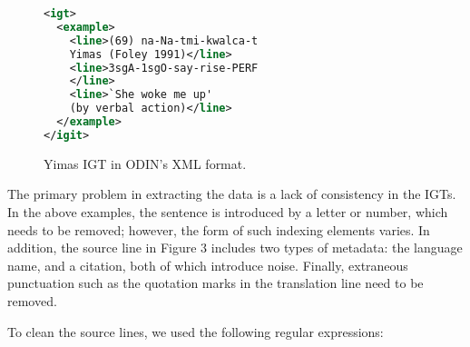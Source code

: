 


\begin{figure}
\begin{lstlisting}[language=XML]
<igt>
  <example>
    <line>(69) na-Na-tmi-kwalca-t 
    Yimas (Foley 1991)</line>
    <line>3sgA-1sgO-say-rise-PERF
    </line>
    <line>`She woke me up' 
    (by verbal action)</line>
  </example>
</igit>
\end{lstlisting} 
\smallskip
\caption{Yimas IGT in ODIN's XML format.}\label{fig:odin_yimas_xml}
\end{figure}



The primary problem in extracting the data is a lack of consistency in the IGTs. In the above examples, the sentence is introduced by a letter or number, which needs to be removed; however, the form of such indexing elements varies. In addition, the source line in Figure 3 includes two types of metadata: the language name, and a citation, both of which introduce noise.  Finally, extraneous punctuation such as the quotation marks in the translation line need to be removed.

To clean the source lines, we used the following regular expressions:

